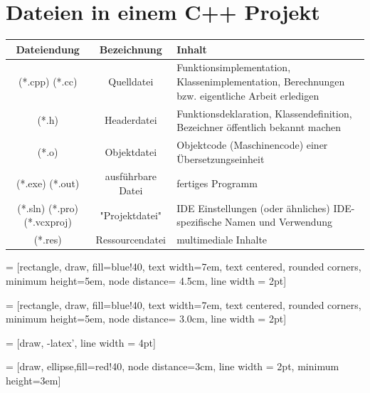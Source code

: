 \documentclass[a4paper]{report}
\begin{document}
\section{Dateien in einem C++ Projekt}
\begin{center}
\begin{tabular}{|c|c|p{8.5cm}|}
	\hline
	Dateiendung & Bezeichnung & Inhalt \\
	\hline
	(*.cpp) (*.cc) & Quelldatei & Funktionsimplementation, Klassenimplementation, \newline Berechnungen bzw. eigentliche Arbeit erledigen \\ \hline
	(*.h) & Headerdatei & Funktionsdeklaration, Klassendefinition, \newline Bezeichner öffentlich bekannt machen \\
	\hline
	(*.o) & Objektdatei & Objektcode (Maschinencode) einer Übersetzungseinheit\\
	\hline
	(*.exe) (*.out) & ausführbare Datei & fertiges Programm \\
	\hline \hline
	(*.sln) (*.pro) (*.vcxproj) & "Projektdatei" & IDE Einstellungen (oder ähnliches) \newline IDE-spezifische Namen und Verwendung\\
	\hline \hline
	(*.res) & Ressourcendatei & multimediale Inhalte\\
	\hline
\end{tabular}

\vspace{4ex}

 = [rectangle, draw, fill=blue!40, 
text width=7em, text centered, rounded corners, minimum height=5em, node distance= 4.5cm, line width = 2pt]


 = [rectangle, draw, fill=blue!40, 
text width=7em, text centered, rounded corners, minimum height=5em, node distance= 3.0cm, line width = 2pt]


 = [draw, -latex', line width = 4pt]


 = [draw, ellipse,fill=red!40, node distance=3cm, line width = 2pt,
minimum height=3em]

{\large

}
\end{center}
\end{document}
